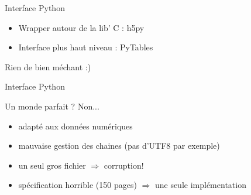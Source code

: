\documentclass[10pt]{beamer}
\begin{document}
\begin{frame}[fragile]{Interface Python}

	\begin{itemize}
		\item Wrapper autour de la lib' C : \alert{h5py}
		\item Interface plus haut niveau : \alert{PyTables}
	\end{itemize}

\lstI

\begin{center}
	Rien de bien méchant :)
\end{center}
\end{frame}

\begin{frame}[fragile]{Interface Python}

\lstI
\end{frame}

\begin{frame}{Un monde parfait ?}
	Non...

	\begin{itemize}
		\item adapté aux données numériques
		\item mauvaise gestion des chaines (pas d'UTF8 par exemple)
		\item un seul gros fichier $\Rightarrow$ corruption!
		\item spécification horrible (150 pages) $\Rightarrow$ une seule implémentation
	\end{itemize}
\end{frame}
\end{document}
